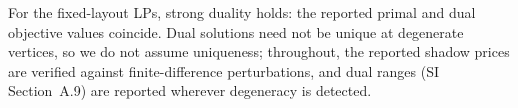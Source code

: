 \begin{assumption}
\label{ass:duality}
For the fixed-layout LPs, strong duality holds: the reported primal and dual
objective values coincide. Dual solutions need not be unique at degenerate
vertices, so we do not assume uniqueness; throughout, the reported shadow
prices are verified against finite-difference perturbations, and dual ranges
(SI Section~A.9) are reported wherever degeneracy is detected.
\end{assumption}
